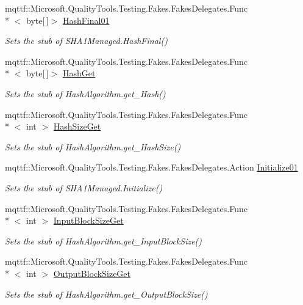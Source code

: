 \begin{DoxyCompactItemize}
mqttf\-::\-Microsoft.\-Quality\-Tools.\-Testing.\-Fakes.\-Fakes\-Delegates.\-Func\\*
$<$ byte\mbox{[}$\,$\mbox{]}$>$ \hyperlink{class_system_1_1_security_1_1_cryptography_1_1_fakes_1_1_stub_s_h_a1_managed_a4ba3d8712ccf9f2b05d29ae6e5a97266}{Hash\-Final01}
\begin{DoxyCompactList}\small\item\em Sets the stub of S\-H\-A1\-Managed.\-Hash\-Final()\end{DoxyCompactList}\item 
mqttf\-::\-Microsoft.\-Quality\-Tools.\-Testing.\-Fakes.\-Fakes\-Delegates.\-Func\\*
$<$ byte\mbox{[}$\,$\mbox{]}$>$ \hyperlink{class_system_1_1_security_1_1_cryptography_1_1_fakes_1_1_stub_s_h_a1_managed_a92543470f9e739eb740f6337ddf19a54}{Hash\-Get}
\begin{DoxyCompactList}\small\item\em Sets the stub of Hash\-Algorithm.\-get\-\_\-\-Hash()\end{DoxyCompactList}\item 
mqttf\-::\-Microsoft.\-Quality\-Tools.\-Testing.\-Fakes.\-Fakes\-Delegates.\-Func\\*
$<$ int $>$ \hyperlink{class_system_1_1_security_1_1_cryptography_1_1_fakes_1_1_stub_s_h_a1_managed_a45a5e1bbfc89f92d4656c5fc7dc78ee1}{Hash\-Size\-Get}
\begin{DoxyCompactList}\small\item\em Sets the stub of Hash\-Algorithm.\-get\-\_\-\-Hash\-Size()\end{DoxyCompactList}\item 
mqttf\-::\-Microsoft.\-Quality\-Tools.\-Testing.\-Fakes.\-Fakes\-Delegates.\-Action \hyperlink{class_system_1_1_security_1_1_cryptography_1_1_fakes_1_1_stub_s_h_a1_managed_aeefea971eff3fd70c5cb6893564f5ac6}{Initialize01}
\begin{DoxyCompactList}\small\item\em Sets the stub of S\-H\-A1\-Managed.\-Initialize()\end{DoxyCompactList}\item 
mqttf\-::\-Microsoft.\-Quality\-Tools.\-Testing.\-Fakes.\-Fakes\-Delegates.\-Func\\*
$<$ int $>$ \hyperlink{class_system_1_1_security_1_1_cryptography_1_1_fakes_1_1_stub_s_h_a1_managed_aa301f625a809a38edd6d992312cbe509}{Input\-Block\-Size\-Get}
\begin{DoxyCompactList}\small\item\em Sets the stub of Hash\-Algorithm.\-get\-\_\-\-Input\-Block\-Size()\end{DoxyCompactList}\item 
mqttf\-::\-Microsoft.\-Quality\-Tools.\-Testing.\-Fakes.\-Fakes\-Delegates.\-Func\\*
$<$ int $>$ \hyperlink{class_system_1_1_security_1_1_cryptography_1_1_fakes_1_1_stub_s_h_a1_managed_aa5da1c99babd332a07c5b4231fb0025d}{Output\-Block\-Size\-Get}
\begin{DoxyCompactList}\small\item\em Sets the stub of Hash\-Algorithm.\-get\-\_\-\-Output\-Block\-Size()\end{DoxyCompactList}\end{DoxyCompactItemize}
